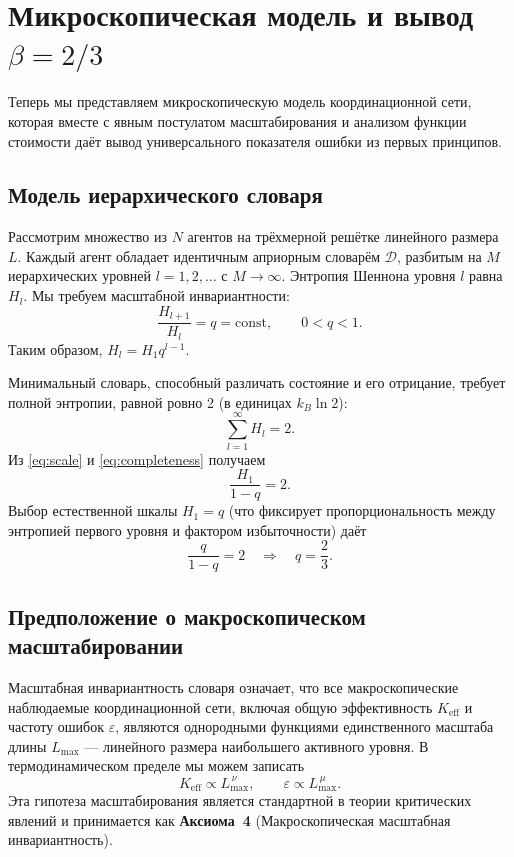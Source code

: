 \documentclass[11pt,a4paper]{article}
\newcommand{\Dir}{\mathcal{D}}
\begin{document}
	\section{Микроскопическая модель и вывод \(\beta = 2/3\)}
	\label{sec:micro}
	
	Теперь мы представляем микроскопическую модель координационной сети, которая вместе с явным постулатом масштабирования и анализом функции стоимости даёт вывод универсального показателя ошибки из первых принципов.
	
	\subsection{Модель иерархического словаря}
	Рассмотрим множество из \(N\) агентов на трёхмерной решётке линейного размера \(L\). Каждый агент обладает идентичным априорным словарём \(\Dir\), разбитым на \(M\) иерархических уровней \(l = 1,2,\dots\) с \(M \to \infty\). Энтропия Шеннона уровня \(l\) равна \(H_l\). Мы требуем масштабной инвариантности:
	\begin{equation}
		\frac{H_{l+1}}{H_l} = q = \text{const}, \qquad 0 < q < 1. \label{eq:scale}
	\end{equation}
	Таким образом, \(H_l = H_1 q^{l-1}\).
	
	Минимальный словарь, способный различать состояние и его отрицание, требует полной энтропии, равной ровно 2 (в единицах \(k_B \ln 2\)):
	\begin{equation}
		\sum_{l=1}^{\infty} H_l = 2. \label{eq:completeness}
	\end{equation}
	Из \eqref{eq:scale} и \eqref{eq:completeness} получаем
	\[
	\frac{H_1}{1-q} = 2.
	\]
	Выбор естественной шкалы \(H_1 = q\) (что фиксирует пропорциональность между энтропией первого уровня и фактором избыточности) даёт
	\[
	\frac{q}{1-q} = 2 \quad\Longrightarrow\quad q = \frac{2}{3}. \label{eq:qval}
	\]
	
	\subsection{Предположение о макроскопическом масштабировании}
	Масштабная инвариантность словаря означает, что все макроскопические наблюдаемые координационной сети, включая общую эффективность \(K_{\mathrm{eff}}\) и частоту ошибок \(\varepsilon\), являются однородными функциями единственного масштаба длины \(L_{\max}\) — линейного размера наибольшего активного уровня. В термодинамическом пределе мы можем записать
	\begin{equation}
		K_{\mathrm{eff}} \propto L_{\max}^{\,\nu}, \qquad \varepsilon \propto L_{\max}^{\,\mu}. \label{eq:scaling-assume}
	\end{equation}
	Эта гипотеза масштабирования является стандартной в теории критических явлений и принимается как \textbf{Аксиома~4} (Макроскопическая масштабная инвариантность).
	
\end{document}
